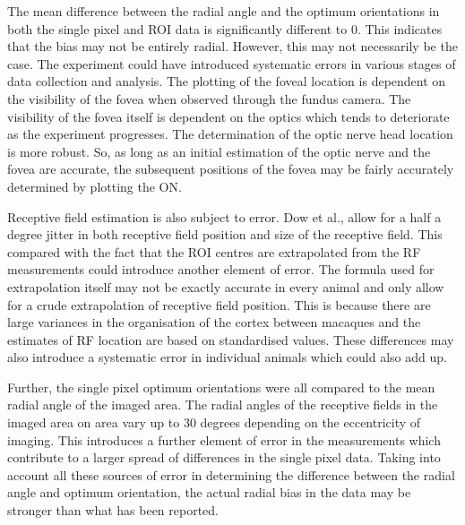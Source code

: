 		
		The mean difference between the radial angle and the optimum orientations in both the single pixel and ROI data is significantly different to 0. This indicates that the bias may not be entirely radial. However, this may not necessarily be the case. The experiment could have introduced systematic errors in various stages of data collection and analysis. The plotting of the foveal location is dependent on the visibility of the fovea when observed through the fundus camera. The visibility of the fovea itself is dependent on the optics which tends to deteriorate as the experiment progresses. The determination of the optic nerve head location is more robust. So, as long as an initial estimation of the optic nerve and the fovea are accurate, the subsequent positions of the fovea may be fairly accurately determined by plotting the ON.
		
		
		Receptive field estimation is also subject to error. Dow et al., allow for a half a degree jitter in both receptive field position and size of the receptive field. This compared with the fact that the ROI centres are extrapolated from the RF measurements could introduce another element of error. The formula used for extrapolation itself may not be exactly accurate in every animal and only allow for a crude extrapolation of receptive field position. This is because there are large variances in the organisation of the cortex between macaques and the estimates of RF location are based on standardised values. These differences may also introduce a systematic error in individual animals which could also add up.
		
		Further, the single pixel optimum orientations were all compared to the mean radial angle of the imaged area. The radial angles of the receptive fields in the imaged area on area vary up to 30 degrees depending on the eccentricity of imaging. This introduces a further element of error in the measurements which contribute to a larger spread of differences in the single pixel data. Taking into account all these sources of error in determining the difference between the radial angle and optimum orientation, the actual radial bias in the data may be stronger than what has been reported.
		
